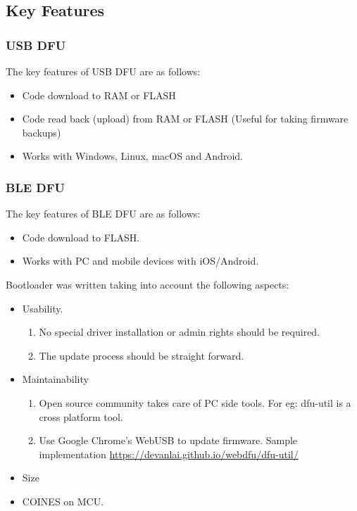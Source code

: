 \documentclass{article}
\begin{document}
\subsection{Key Features}

\subsubsection{USB DFU}
The key features of USB DFU are as follows:
\begin{itemize}
	\item Code download to RAM or FLASH
	\item Code read back (upload) from  RAM or FLASH (Useful for taking firmware backups)
	\item Works with Windows, Linux, macOS and Android.
\end{itemize}

\subsubsection{BLE DFU}
The key features of BLE DFU are as follows:
\begin{itemize}
	\item Code download to FLASH.
	\item Works with PC and mobile devices with iOS/Android.
\end{itemize}

Bootloader was written taking into account the following aspects:
\begin{itemize}
	\item Usability.
	\begin{enumerate}[label=\roman*.]
		\item No special driver installation or admin rights should be required.
		\item The update process should be straight forward.
	\end{enumerate}
	\item Maintainability
	\begin{enumerate}[label=\roman*.]
		\item Open source community takes care of PC side tools. For eg: dfu-util is a cross platform tool.
		\item Use Google Chrome's WebUSB to update firmware. Sample implementation \url{https://devanlai.github.io/webdfu/dfu-util/}
	\end{enumerate}
	\item Size
	\item COINES on MCU.
\end{itemize}
\end{document}
